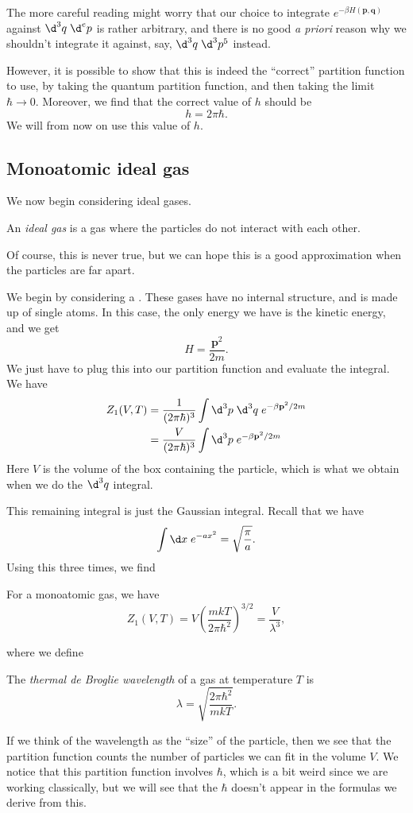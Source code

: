 \documentclass[a4paper]{article}
\begin{document}
The more careful reading might worry that our choice to integrate $e^{-\beta H(\mathbf{p}, \mathbf{q})}$ against $\d^3 q\; \d^e p$ is rather arbitrary, and there is no good \emph{a priori} reason why we shouldn't integrate it against, say, $\d^3 q\; \d^3 p^5$ instead.

However, it is possible to show that this is indeed the ``correct'' partition function to use, by taking the quantum partition function, and then taking the limit $\hbar \to 0$. Moreover, we find that the correct value of $h$ should be
\[
  h = 2\pi \hbar.
\]
We will from now on use this value of $h$.

\subsection{Monoatomic ideal gas}
We now begin considering ideal gases.
\begin{defi}
  An \emph{ideal gas} is a gas where the particles do not interact with each other.
\end{defi}
Of course, this is never true, but we can hope this is a good approximation when the particles are far apart.

We begin by considering a . These gases have no internal structure, and is made up of single atoms. In this case, the only energy we have is the kinetic energy, and we get
\[
  H = \frac{\mathbf{p}^2}{2m}.
\]
We just have to plug this into our partition function and evaluate the integral. We have
\begin{align*}
  Z_1(V, T) &= \frac{1}{(2\pi \hbar)^3} \int \d^3 p\; \d^3 q\; e^{-\beta \mathbf{p}^2 /2m}\\
  &= \frac{V}{(2\pi \hbar)^3} \int \d^3 p\; e^{-\beta \mathbf{p}^2/2m}
\end{align*}
Here $V$ is the volume of the box containing the particle, which is what we obtain when we do the $\d^3 q$ integral.

This remaining integral is just the Gaussian integral. Recall that we have
\[
  \int \d x\; e^{-a x^2} = \sqrt{\frac{\pi}{a}}.
\]
Using this three times, we find
\begin{prop}
  For a monoatomic gas, we have
  \[
    Z_1(V, T) = V\left(\frac{mkT}{2\pi \hbar^2}\right)^{3/2} = \frac{V}{\lambda^3},
  \]
\end{prop}
where we define
\begin{defi}\index{$\lambda$}
  The \emph{thermal de Broglie wavelength} of a gas at temperature $T$ is
  \[
    \lambda = \sqrt{\frac{2\pi \hbar^2}{mkT}}.
  \]
\end{defi}
If we think of the wavelength as the ``size'' of the particle, then we see that the partition function counts the number of particles we can fit in the volume $V$. We notice that this partition function involves $\hbar$, which is a bit weird since we are working classically, but we will see that the $\hbar$ doesn't appear in the formulas we derive from this.
\end{document}

